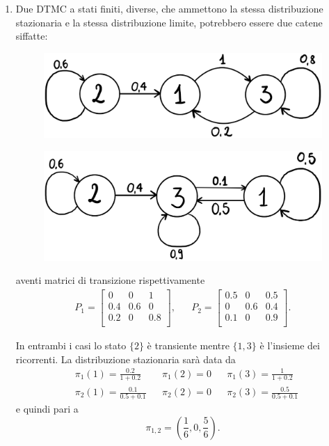 \documentclass[12pt]{homework}
\begin{document}
\begin{enumerate}
     \item
     Due DTMC a stati finiti, diverse, che ammettono la stessa distribuzione stazionaria e la stessa distribuzione limite, potrebbero essere due catene siffatte:
     
     \begin{figure}[htb]\centering
\includegraphics[scale=0.08]{Catena2.1.eps}
  \end{figure}
      
     \begin{figure}[htb]\centering
\includegraphics[scale=0.08]{Catena2.2.eps}
  \end{figure}

  aventi matrici di transizione rispettivamente
  \begin{align*}
    P_{1}=\begin{bmatrix}
        0 & 0 & 1\\
        0.4 & 0.6 & 0\\ 
        0.2 & 0 & 0.8\\
      \end{bmatrix}, &&  
      P_{2}=\begin{bmatrix}
         0.5 & 0 & 0.5\\
         0 & 0.6 & 0.4\\
         0.1 & 0 & 0.9\\ 
      \end{bmatrix}.
    \end{align*}
 
  In entrambi i casi lo stato $\{2\}$ è transiente mentre $\{1,3\}$ è l'insieme dei ricorrenti. 
La distribuzione stazionaria sarà data da 
   \begin{align*}
   &\pi_1(1) = \frac{0.2}{1+0.2} && \pi_1(2) = 0 &&    \pi_1(3) = \frac{1}{1+0.2}\\
   &\pi_2(1) = \frac{0.1}{0.5+0.1} && \pi_2(2) = 0
 &&\pi_2(3) = \frac{0.5}{0.5+0.1} 
     \end{align*}
     e quindi pari a 
     \begin{equation*}
     \pi_{1,2} = \left(\frac{1}{6}, 0, \frac{5}{6}\right).
     \end{equation*}
     

\end{enumerate}
\end{document}
